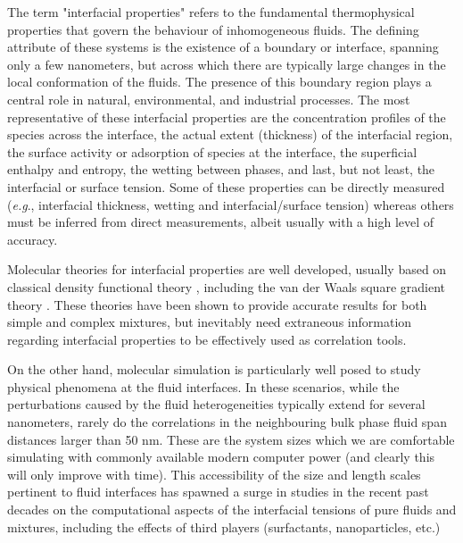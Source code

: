 \documentclass{scrbook}
\begin{document}
The term "interfacial properties" refers to the fundamental thermophysical
properties that govern the behaviour of inhomogeneous fluids. The defining
attribute of these systems is the existence of a boundary or interface,
spanning only a few nanometers, but across which there are typically large
changes in the local conformation of the fluids. The presence of this boundary
region plays a central role in natural, environmental, and industrial
processes. The most representative of these interfacial properties are the
concentration profiles of the species across the interface, the actual extent
(thickness) of the interfacial region, the surface activity or adsorption of
species at the interface, the superficial enthalpy and entropy, the wetting
between phases, and last, but not least, the interfacial or surface tension.
Some of these properties can be directly measured (\textit{e.g}., interfacial
thickness, wetting and interfacial/surface tension) \citep{evans2006}
whereas others must be inferred from direct measurements, albeit
usually with a high level of accuracy. 

Molecular theories for interfacial properties are well developed, usually based
on classical density functional theory \citep{evans1992}, including the van der Waals square gradient
theory \citep{davis1982}.
These theories have been shown to provide accurate results for both simple and
complex mixtures, but inevitably need extraneous information regarding
interfacial properties to be effectively used as correlation tools.

On the other hand, molecular simulation is particularly well posed to study
physical phenomena at the fluid interfaces. In these scenarios, while the
perturbations caused by the fluid heterogeneities typically extend for several
nanometers, rarely do the correlations in the neighbouring bulk phase fluid
span distances larger than 50 nm. These are the system sizes which we are
comfortable simulating with commonly available modern computer power (and
clearly this will only improve with time). This accessibility of the size and
length scales pertinent to fluid interfaces has spawned a surge in studies in
the recent past decades on the computational aspects of the interfacial
tensions of pure fluids and mixtures, including the effects of third players
(surfactants, nanoparticles, etc.) 
\end{document}

